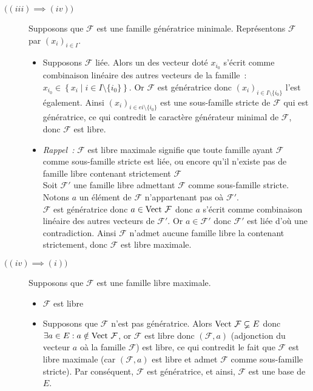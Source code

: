 \documentclass{article}
\renewenvironment{question_kholle}[2][ ]
{
	\subsection{\texorpdfstring{#2}{}}
	\notblank{#1}
	{
		\noindent #1
		\bigbreak
	}
	{}
	\begin{proof}
}
{
	\end{proof}
}
\begin{document}
\begin{question_kholle}
\begin{description}
		\item[$\bigl((iii) \implies (iv)\bigr)$] Supposons que $\mathcal{F}$ est une famille génératrice minimale. Représentons $\mathcal{F}$ par $(x_{i})_{i\in I}$.
		      \begin{itemize}
			      \item Supposons $\mathcal{F}$ liée. Alors un des vecteur doté $x_{i_{0}}$ s’écrit comme combinaison linéaire des autres vecteurs de la famille~: $x_{i_{0}} \in \left\{x_{i} \mid i\in I\setminus \{i_{0}\}\right\}$. Or $\mathcal{F}$ est génératrice donc $(x_{i})_{i\in I\setminus \{i_{0}\}}$ l’est également. Ainsi $(x_{i})_{i\in ei\setminus \{i_{0}\}}$ est une sous-famille stricte de $\mathcal{F}$ qui est génératrice, ce qui contredit le caractère générateur minimal de $\mathcal{F}$, donc $\mathcal{F}$ est libre.
			      \item \textit{Rappel~:} $\mathcal{F}$ est libre maximale signifie que toute famille ayant $\mathcal{F}$ comme sous-famille stricte est liée, ou encore qu’il n’existe pas de famille libre contenant strictement $\mathcal{F}$\\[4pt]
			            Soit $\mathcal{F'}$ une famille libre admettant $\mathcal{F}$ comme sous-famille stricte. Notons $a$ un élément de $\mathcal{F}$ n’appartenant pas oà $\mathcal{F'}$.\\
			            $\mathcal{F}$ est génératrice donc $a\in\text{Vect }\mathcal{F}$ donc $a$ s’écrit comme combinaison linéaire des autres vecteurs de $\mathcal{F'}$. Or $a\in \mathcal{F'}$ donc $\mathcal{F'}$ est liée d’où une contradiction. Ainsi $\mathcal{F}$ n’admet aucune famille libre la contenant strictement, donc $\mathcal{F}$ est libre maximale.
		      \end{itemize}

		\item[$\bigl((iv) \implies (i)\bigr)$] Supposons que $\mathcal{F}$ est une famille libre maximale.
		      \begin{itemize}
			      \item $\mathcal{F}$ est libre
			      \item Supposons que $\mathcal{F}$ n’est pas génératrice. Alors $\text{Vect }\mathcal{F} \varsubsetneq E$ donc $\exists a\in E: a\notin \text{Vect } \mathcal{F}$, or $\mathcal{F}$ est libre donc $(\mathcal{F}, a)$ (adjonction du vecteur $a$ oà la famille $\mathcal{F}$) est libre, ce qui contredit le fait que $\mathcal{F}$ est libre maximale (car $(\mathcal{F}, a)$ est libre et admet $\mathcal{F}$ comme sous-famille stricte). Par conséquent, $\mathcal{F}$ est génératrice, et ainsi, $\mathcal{F}$ est une base de $E$.
		      \end{itemize}


	\end{description}
\end{question_kholle}
\end{document}
